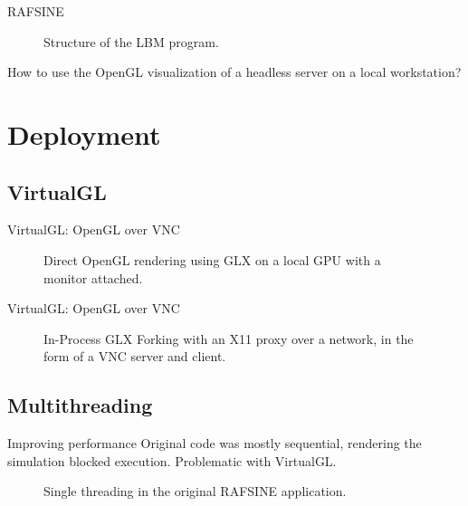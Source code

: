 \documentclass{beamer}
\begin{document}
\begin{frame}{RAFSINE}
\begin{figure}[!htb]
\centering
\begin{scriptsize}
\def\svgwidth{0.7\linewidth}

\end{scriptsize}
\caption{Structure of the LBM program.}
\label{fig:lbm-core}
\end{figure}
How to use the OpenGL visualization of a headless server on a local workstation?
\end{frame}

\section{Deployment}
\subsection{VirtualGL}
\begin{frame}{VirtualGL: OpenGL over VNC}
\begin{figure}[!htb]
\centering
\begin{scriptsize}
\def\svgwidth{0.7\linewidth}

\end{scriptsize}
\caption{Direct OpenGL rendering using GLX on a local GPU with a monitor attached.}
\label{fig:virtualgl_direct}
\end{figure}
\end{frame}

\begin{frame}{VirtualGL: OpenGL over VNC}
\begin{figure}[!htb]
\centering
\begin{scriptsize}
\def\svgwidth{0.9\linewidth}

\end{scriptsize}
\caption{In-Process GLX Forking with an X11 proxy over a network, in the form of a VNC server and client.}
\label{fig:virtualgl_forking}
\end{figure}
\end{frame}

\subsection{Multithreading}
\begin{frame}{Improving performance}
Original code was mostly sequential, rendering the simulation blocked execution. Problematic with VirtualGL.
\begin{figure}[!htb]
\hspace*{-0.3in}
\centering
\begin{tiny}
\def\svgwidth{1.1\linewidth}

\end{tiny}
\caption{Single threading in the original RAFSINE application.}
\label{fig:singlethreading}
\end{figure}
\end{frame}
\end{document}
